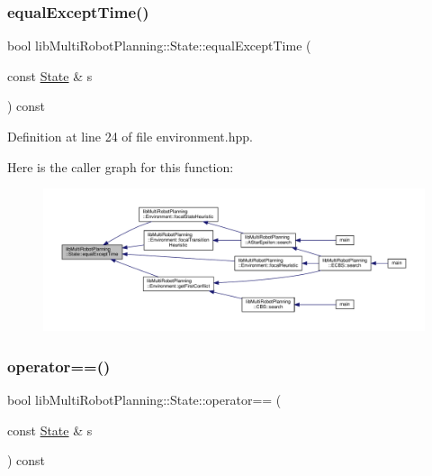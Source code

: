 \subsubsection{\texorpdfstring{equal\+Except\+Time()}{equalExceptTime()}}
{\footnotesize\ttfamily bool lib\+Multi\+Robot\+Planning\+::\+State\+::equal\+Except\+Time (\begin{DoxyParamCaption}\item[{const \hyperlink{structlib_multi_robot_planning_1_1_state}{State} \&}]{s }\end{DoxyParamCaption}) const\hspace{0.3cm}{\ttfamily [inline]}}



Definition at line 24 of file environment.\+hpp.

Here is the caller graph for this function\+:
\nopagebreak
\begin{figure}[H]
\begin{center}
\leavevmode
\includegraphics[width=350pt]{structlib_multi_robot_planning_1_1_state_a1067b5c669fb82dce96b4f07476ea655_icgraph}
\end{center}
\end{figure}
\mbox{\label{structlib_multi_robot_planning_1_1_state_ac4e1772061abe4e9e5eda48d0ffb3133}} 
\subsubsection{\texorpdfstring{operator==()}{operator==()}}
{\footnotesize\ttfamily bool lib\+Multi\+Robot\+Planning\+::\+State\+::operator== (\begin{DoxyParamCaption}\item[{const \hyperlink{structlib_multi_robot_planning_1_1_state}{State} \&}]{s }\end{DoxyParamCaption}) const\hspace{0.3cm}{\ttfamily [inline]}}



